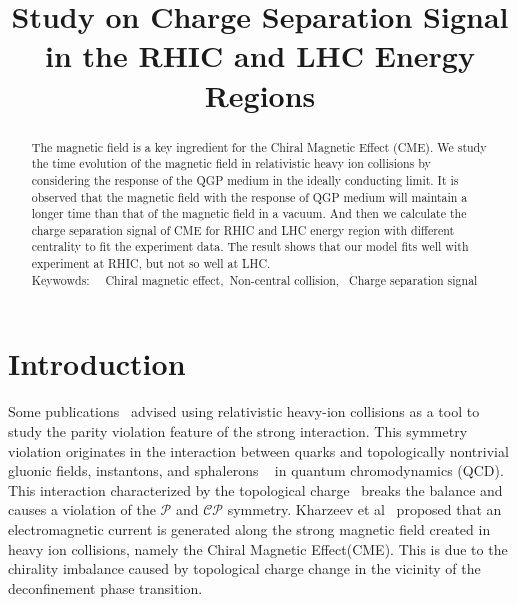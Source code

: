 \documentclass[twocolumn,showpacs,preprintnumbers,amsmath,amssymb]{revtex4}
\begin{document}
\title{Study on Charge Separation Signal in the RHIC and LHC Energy Regions}





\begin{abstract}
The magnetic field is a key ingredient for the Chiral Magnetic Effect (CME). We study the time evolution of the magnetic field in relativistic heavy ion collisions by considering the response of the QGP medium in the ideally conducting limit. It is observed that the magnetic field with the response of QGP medium will maintain a longer time than that of the magnetic field in a vacuum. And then we calculate the charge separation signal of CME for RHIC and LHC energy region with different centrality to fit the experiment data. The result shows that our model fits well with experiment at RHIC, but not so well at LHC. \\

\vskip0.2cm \noindent Keywowds: ~~Chiral magnetic effect,~Non-central collision, ~Charge separation signal
\end{abstract}


 \maketitle


\section{Introduction}
\label{intro}
Some publications~\cite{lab1,lab2,lab3} advised using relativistic heavy-ion collisions as a tool to study the parity violation feature of the strong interaction.
This symmetry violation originates in the interaction between quarks and topologically nontrivial
gluonic fields, instantons, and sphalerons ~\cite{lab4} in quantum chromodynamics (QCD). This interaction characterized by the topological charge~\cite{lab5} breaks
the balance and causes a violation of the $\mathcal{P}$ and $\mathcal{CP}$ symmetry. Kharzeev et al~\cite{lab6,lab7} proposed that an electromagnetic current is generated along the strong magnetic field created in heavy ion collisions, namely the Chiral Magnetic Effect(CME). This is due to the chirality imbalance caused by topological charge change in the vicinity of the deconfinement phase transition.
\end{document}
